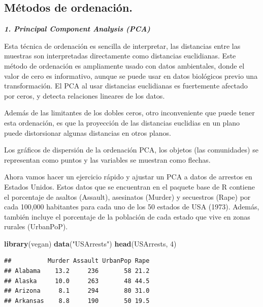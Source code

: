 \documentclass[]{book}
\newenvironment{Shaded}{\begin{snugshade}}{\end{snugshade}}
\newcommand{\KeywordTok}[1]{\textcolor[rgb]{0.13,0.29,0.53}{\textbf{{#1}}}}
\newcommand{\DecValTok}[1]{\textcolor[rgb]{0.00,0.00,0.81}{{#1}}}
\newcommand{\StringTok}[1]{\textcolor[rgb]{0.31,0.60,0.02}{{#1}}}
\newcommand{\NormalTok}[1]{{#1}}
\begin{document}
\subsection{Métodos de ordenación.}\label{metodos-de-ordenacion.}

\textbf{\emph{1. Principal Component Analysis (PCA)}}

Esta técnica de ordenación es sencilla de interpretar, las distancias
entre las muestras son interpretadas directamente como distancias
euclidianas. Este método de ordenación es ampliamente usado con datos
ambientales, donde el valor de cero es informativo, aunque se puede usar
en datos biológicos previo una transformación. El PCA al usar distancias
euclidianas es fuertemente afectado por ceros, y detecta relaciones
lineares de los datos.

Además de las limitantes de los dobles ceros, otro inconveniente que
puede tener esta ordenación, es que la proyección de las distancias
euclidias en un plano puede distorsionar algunas distancias en otros
planos.

Los gráficos de dispersión de la ordenación PCA, los objetos (las
comunidades) se representan como puntos y las variables se muestran como
flechas.

Ahora vamos hacer un ejercicio rápido y ajustar un PCA a datos de
arrestos en Estados Unidos. Estos datos que se encuentran en el paquete
base de R contiene el porcentaje de asaltos (Assault), asesinatos
(Murder) y secuestros (Rape) por cada 100,000 habitantes para cada uno
de los 50 estados de USA (1973). Además, también incluye el porcentaje
de la población de cada estado que vive en zonas rurales (UrbanPoP).

\begin{Shaded}
\begin{Highlighting}[]
\KeywordTok{library}\NormalTok{(vegan)}
\KeywordTok{data}\NormalTok{(}\StringTok{"USArrests"}\NormalTok{)}
\KeywordTok{head}\NormalTok{(USArrests, }\DecValTok{4}\NormalTok{)}
\end{Highlighting}
\end{Shaded}

\begin{verbatim}
##          Murder Assault UrbanPop Rape
## Alabama    13.2     236       58 21.2
## Alaska     10.0     263       48 44.5
## Arizona     8.1     294       80 31.0
## Arkansas    8.8     190       50 19.5
\end{verbatim}
\end{document}

